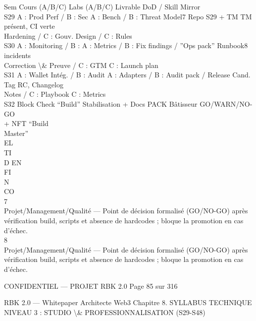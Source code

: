 \documentclass[12pt,landscape,a4paper]{article}
\newenvironment{confidential}
{\begin{tcolorbox}[
    colback=rbkred!5!white,
    colframe=rbkred!75!black,
    title=CONFIDENTIEL,
    fonttitle=\bfseries\color{white},
    coltitle=rbkred!75!black,
    breakable,
    enhanced,
    frame hidden,
    borderline west={2pt}{0pt}{rbkred!75!black}
]}
{\end{tcolorbox}}
\begin{document}
\vspace{0.5em}
\vspace{0.5em}
Sem Cours (A/B/C)                 Labs (A/B/C)                     Livrable                        DoD / Skill Mirror\\
S29 A : Prod Perf / B : Sec       A : Bench / B : Threat Model7 Repo S29 + TM                      TM présent, CI verte\\
Hardening / C : Gouv. Design / C : Rules\\
S30 A : Monitoring / B :          A : Metrics / B : Fix findings / ”Ops pack”                      Runbook8 incidents\\
Correction \textbackslash{}& Preuve / C : GTM C : Launch plan\\
S31 A : Wallet Intég. / B : Audit A : Adapters / B : Audit pack / Release Cand.                    Tag RC, Changelog\\
Notes / C : Playbook          C : Metrics\\
S32 Block Check “Build”           Stabilisation + Docs             PACK Bâtisseur                 GO/WARN/NO-GO\\
+ NFT “Build\\
Master”\\
\vspace{0.5em}
\vspace{0.5em}
\vspace{0.5em}
\vspace{0.5em}
EL\\
TI\\
D     EN\\
FI\\
N\\
CO\\
\vspace{0.5em}
\vspace{0.5em}
\vspace{0.5em}
\vspace{0.5em}
7\\
Projet/Management/Qualité — Point de décision formalisé (GO/NO-GO) après vérification build, scripts et absence de hardcodes ; bloque la promotion en cas d’échec.\\
8\\
Projet/Management/Qualité — Point de décision formalisé (GO/NO-GO) après vérification build, scripts et absence de hardcodes ; bloque la promotion en cas d’échec.\\
\vspace{0.5em}
\vspace{0.5em}
\begin{confidential}CONFIDENTIEL — PROJET RBK 2.0                                            Page 85 sur 316\end{confidential}
RBK 2.0 — Whitepaper Architecte Web3                                                Chapitre 8. SYLLABUS TECHNIQUE\\
\vspace{0.5em}
\vspace{0.5em}
\vspace{0.5em}
NIVEAU 3 : STUDIO \textbackslash{}& PROFESSIONNALISATION (S29-S48)\\
\vspace{0.5em}
\end{document}
